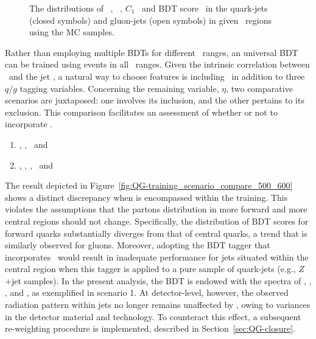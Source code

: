\begin{figure}[htbp]
	\caption[]{
		The distributions of \ntrk~, \wtrk~, $C_1$~ and BDT score~ in the quark-jets (closed symbols) and gluon-jets (open symbols) in given \pt~regions using the \pythia MC samples.
		\label{fig:QG-pythia-Unc_Ntrk-wp11q}
	}
\end{figure}

Rather than employing multiple BDTs for different \pt~ranges, an universal BDT can be trained using events in all \pt~ranges.
Given the intrinsic correlation between \ntrk~and the jet \pt, a natural way to choose features is including \pt~in addition to three $q/g$ tagging variables.    
Concerning the remaining variable, $\eta$, two comparative scenarios are juxtaposed: one involves its inclusion, and the other pertains to its exclusion. This comparison facilitates an assessment of whether or not to incorporate \abseta.

\begin{enumerate}
	\item \pt, \ntrk, \wtrk~and \cbeta
	\item \pt, \abseta, \ntrk, \wtrk~and \cbeta
\end{enumerate}

The result depicted in Figure~\ref{fig:QG-training_scenario_compare_500_600} shows a distinct discrepancy when \abseta is encompassed within the training. 
This violates the assumptions that the partons distribution in more forward and more central regions should not change. Specifically, the distribution of BDT scores for forward quarks substantially diverges from that of central quarks, a trend that is similarly observed for gluons. Moreover, adopting the BDT tagger that incorporates \abseta~would result in inadequate performance for jets situated within the central region when this tagger is applied to a pure sample of quark-jets (e.g., $Z$+jet samples).
In the present analysis, the BDT is endowed with the spectra of \pt, \ntrk, \wtrk, and \cbeta, as exemplified in scenario 1. 
At detector-level, however, the observed radiation pattern within jets no longer remains unaffected by \abseta, owing to variances in the detector material and technology. To counteract this effect, a subsequent re-weighting procedure is implemented, described in Section~\ref{sec:QG-closure}. 

